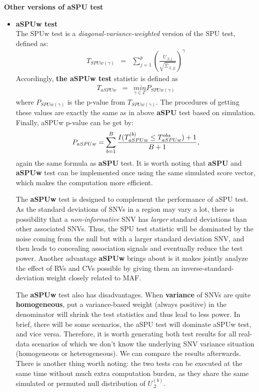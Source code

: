 \documentclass[12pt]{article}
\begin{document}
\textbf{Other versions of aSPU test}
\begin{itemize}
\item \textbf{aSPUw test}\\
The SPUw test is a \textit{diagonal-variance-weighted} version of the SPU test, defined as:
\begin{eqnarray*}
T_{SPUw(\gamma)} & = & \sum_{j=1}^{p}\left(\frac{U_{.2,j}}{\sqrt{\hat{\Sigma}_{.2,jj}}}\right)^{\gamma}
\end{eqnarray*}
Accordingly, \textbf{the aSPUw test} statistic is defined as
\begin{eqnarray*}
T_{aSPUw} & = & \underset{\gamma\in\Gamma}{min}P_{SPUw(\gamma)}
\end{eqnarray*}
where $P_{SPUw(\gamma)}$ is the p-value from $T_{SPUw(\gamma)}$. The procedures of getting these values are exactly the same as in above \textbf{aSPU} test based on simulation. Finally, aSPUw p-value can be get by:
$$
P_{aSPUw} = \sum_{b=1}^B { I(T ^ {(b)} _{aSPUw} \leq T ^ {obs} _{aSPUw} ) + 1  \over B + 1 },
$$
again the same formula as \textbf{aSPU} test. It is worth noting that \textbf{aSPU} and \textbf{aSPUw} test can be implemented once using the same simulated score vector, which makes the computation more efficient.

The \textbf{aSPUw} test is designed to complement the performance of aSPU test. As the standard deviations of SNVs in a region may vary a lot, there is possibility that a \textit{non-informative} SNV has \textit{larger} standard deviations than other associated SNVs. Thus, the SPU test statistic will be dominated by the noise coming from the null but with a larger standard deviation SNV, and then leads to concealing association signals and eventually reduce the test power. Another advantage \textbf{aSPUw} brings about is it makes jointly analyze the effect of RVs and CVs possible by giving them an inverse-standard-deviation weight closely related to MAF. 

The \textbf{aSPUw} test also has disadvantages. When \textbf{variance} of SNVs are quite \textbf{homogeneous}, put a variance-based weight (always positive) in the denominator will shrink the test statistics and thus lead to less power. In brief, there will be some scenarios, the aSPU test will dominate aSPUw test, and vice versa. Therefore, it is worth generating both test results for all real-data scenarios of which we don't know the underlying SNV variance situation (homogeneous or heterogeneous). We can compare the results afterwards. There is another thing worth noting: the two tests can be executed at the same time without much extra computation burden, as they share the same simulated or permuted null distribution of $U_{.2}^{ (b) }$.


\end{itemize}
\end{document}

